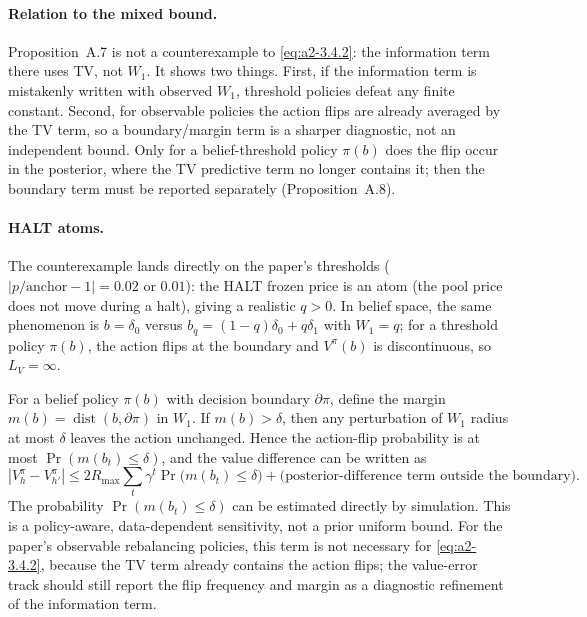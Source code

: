 \paragraph{Relation to the mixed bound.}
Proposition~A.7 is not a counterexample to \eqref{eq:a2-3.4.2}: the information
term there uses TV, not $W_1$.  It shows two things.  First, if the information
term is mistakenly written with observed $W_1$, threshold policies defeat any
finite constant.  Second, for observable policies the action flips are already
averaged by the TV term, so a boundary/margin term is a sharper diagnostic, not
an independent bound.  Only for a belief-threshold policy $\pi(b)$ does the flip
occur in the posterior, where the TV predictive term no longer contains it; then
the boundary term must be reported separately (Proposition~A.8).

\paragraph{HALT atoms.}
The counterexample lands directly on the paper's thresholds
($|p/\text{anchor}-1|=0.02$ or $0.01$): the HALT frozen price is an atom (the
pool price does not move during a halt), giving a realistic $q>0$.
In belief space, the same phenomenon is $b=\delta_0$ versus
$b_q=(1-q)\delta_0+q\delta_1$ with $W_1=q$; for a threshold policy $\pi(b)$, the
action flips at the boundary and $V^\pi(b)$ is discontinuous, so $L_V=\infty$.

\begin{aIIPropBoundary}
For a belief policy $\pi(b)$ with decision boundary $\partial\pi$, define the
margin $m(b)=\operatorname{dist}(b,\partial\pi)$ in $W_1$.  If $m(b)>\delta$,
then any perturbation of $W_1$ radius at most $\delta$ leaves the action
unchanged.  Hence the action-flip probability is at most
$\Pr(m(b_t)\le\delta)$, and the value difference can be written as
\[
|V_h^\pi-V_{h'}^\pi|
\le 2R_{\max}\sum_t\gamma^t\Pr\bigl(m(b_t)\le\delta\bigr)
+\text{(posterior-difference term outside the boundary)}.
\]
The probability $\Pr(m(b_t)\le\delta)$ can be estimated directly by simulation.
This is a policy-aware, data-dependent sensitivity, not a prior uniform bound.
For the paper's observable rebalancing policies, this term is not
necessary for \eqref{eq:a2-3.4.2}, because the TV term already contains the
action flips; the value-error track should still report the flip frequency and
margin as a diagnostic refinement of the information term.
\end{aIIPropBoundary}

